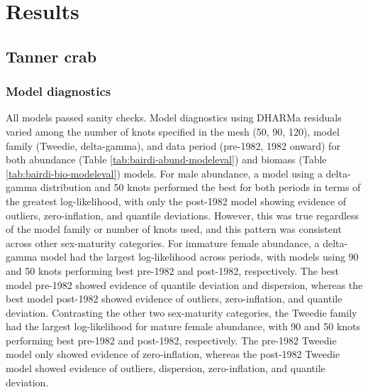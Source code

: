 \documentclass[
]{article}
\begin{document}
\section*{Results}\label{results}

\subsection*{Tanner crab}\label{tanner-crab-1}

\subsubsection*{Model diagnostics}\label{model-diagnostics}

All models passed sanity checks. Model diagnostics using DHARMa residuals varied among the number of knots specified in the mesh (50, 90, 120), model family (Tweedie, delta-gamma), and data period (pre-1982, 1982 onward) for both abundance (Table \ref{tab:bairdi-abund-modeleval}) and biomass (Table \ref{tab:bairdi-bio-modeleval}) models. For male abundance, a model using a delta-gamma distribution and 50 knots performed the best for both periods in terms of the greatest log-likelihood, with only the post-1982 model showing evidence of outliers, zero-inflation, and quantile deviations. However, this was true regardless of the model family or number of knots used, and this pattern was consistent across other sex-maturity categories. For immature female abundance, a delta-gamma model had the largest log-likelihood across periods, with models using 90 and 50 knots performing best pre-1982 and post-1982, respectively. The best model pre-1982 showed evidence of quantile deviation and dispersion, whereas the best model post-1982 showed evidence of outliers, zero-inflation, and quantile deviation. Contrasting the other two sex-maturity categories, the Tweedie family had the largest log-likelihood for mature female abundance, with 90 and 50 knots performing best pre-1982 and post-1982, respectively. The pre-1982 Tweedie model only showed evidence of zero-inflation, whereas the post-1982 Tweedie model showed evidence of outliers, dispersion, zero-inflation, and quantile deviation.
\end{document}
